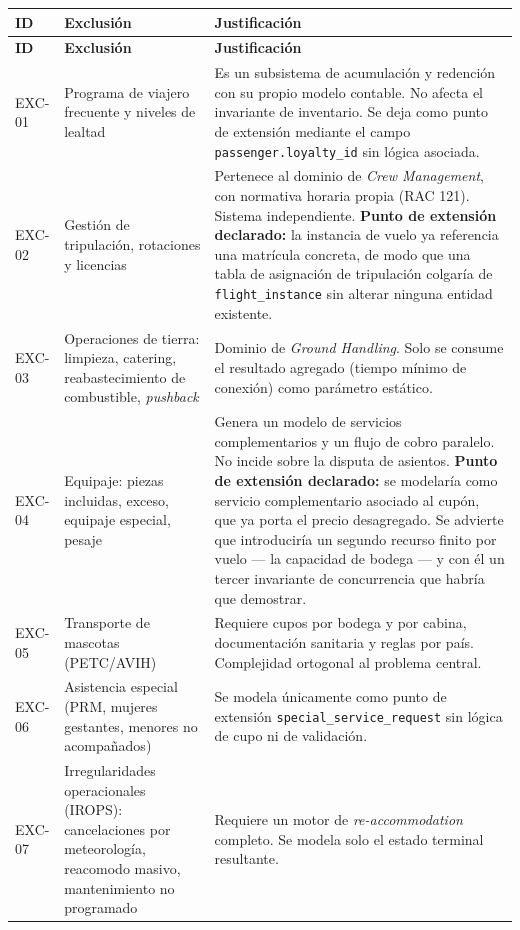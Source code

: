 \documentclass[10pt,letterpaper]{article}
\begin{document}
\begin{longtable}{@{}L{1.6cm} L{5.2cm} L{8.6cm}@{}}
\toprule
\textbf{ID} & \textbf{Exclusión} & \textbf{Justificación} \\
\midrule
\endfirsthead
\toprule
\textbf{ID} & \textbf{Exclusión} & \textbf{Justificación} \\
\midrule
\endhead
EXC-01 & Programa de viajero frecuente y niveles de lealtad & Es un subsistema de acumulación y redención con su propio modelo contable. No afecta el invariante de inventario. Se deja como punto de extensión mediante el campo \texttt{passenger.loyalty\_id} sin lógica asociada. \\
EXC-02 & Gestión de tripulación, rotaciones y licencias & Pertenece al dominio de \emph{Crew Management}, con normativa horaria propia (RAC 121). Sistema independiente. \textbf{Punto de extensión declarado:} la instancia de vuelo ya referencia una matrícula concreta, de modo que una tabla de asignación de tripulación colgaría de \texttt{flight\_instance} sin alterar ninguna entidad existente. \\
EXC-03 & Operaciones de tierra: limpieza, catering, reabastecimiento de combustible, \emph{pushback} & Dominio de \emph{Ground Handling}. Solo se consume el resultado agregado (tiempo mínimo de conexión) como parámetro estático. \\
EXC-04 & Equipaje: piezas incluidas, exceso, equipaje especial, pesaje & Genera un modelo de servicios complementarios y un flujo de cobro paralelo. No incide sobre la disputa de asientos. \textbf{Punto de extensión declarado:} se modelaría como servicio complementario asociado al cupón, que ya porta el precio desagregado. Se advierte que introduciría un segundo recurso finito por vuelo --- la capacidad de bodega --- y con él un tercer invariante de concurrencia que habría que demostrar. \\
EXC-05 & Transporte de mascotas (PETC/AVIH) & Requiere cupos por bodega y por cabina, documentación sanitaria y reglas por país. Complejidad ortogonal al problema central. \\
EXC-06 & Asistencia especial (PRM, mujeres gestantes, menores no acompañados) & Se modela únicamente como punto de extensión \texttt{special\_service\_request} sin lógica de cupo ni de validación. \\
EXC-07 & Irregularidades operacionales (IROPS): cancelaciones por meteorología, reacomodo masivo, mantenimiento no programado & Requiere un motor de \emph{re-accommodation} completo. Se modela solo el estado terminal resultante. \\

\end{longtable}
\end{document}
